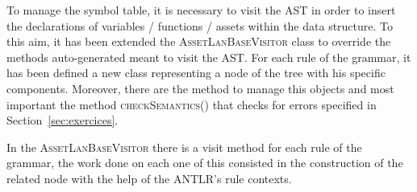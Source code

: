 \documentclass[11pt]{article} %
\begin{document}
\medskip

To manage the symbol table, it is necessary to visit the AST in order to insert the declarations of variables / functions / assets within the data structure. To this aim, it has been extended the \textsc{AssetLanBaseVisitor} class to override the methods auto-generated meant to visit the AST. For each rule of the grammar, it has been defined a new class representing a node of the tree with his specific components. Moreover, there are the method to manage this objects and most important the method \textsc{checkSemantics()} that checks for errors specified in Section~\ref{sec:exercices}.

\medskip

In the \textsc{AssetLanBaseVisitor} there is a visit method for each rule of the grammar, the work done on each one of this consisted in the construction of the related node with the help of the ANTLR's rule contexts. 
\end{document}
